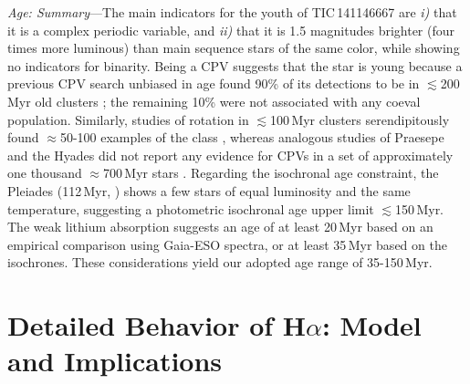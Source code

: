 \documentclass[11pt,twocolumn,tighten,linenumbers]{aastex7}
\begin{document}
{\it Age: Summary}---The main indicators for the youth of
TIC\,141146667 are {\it i)} that it is a complex periodic variable, and
{\it ii)} that it is 1.5 magnitudes brighter (four times more
luminous) than main sequence stars of the same color, while showing no
indicators for binarity.  Being a CPV suggests that the star is young
because a previous CPV search unbiased in age found 90\% of its
detections to be in $\lesssim$200\,Myr old clusters \citep{Bouma2024};
the remaining 10\% were not associated with any coeval population.
Similarly, studies of rotation in $\lesssim$100\,Myr clusters
serendipitously found $\approx$50-100 examples of the class
\citep{Rebull2016,Stauffer2017,Stauffer2018,Rebull2018,Zhan2019,Rebull2020,Stauffer2021,Rebull2022,Popinchalk2023},
whereas analogous studies of Praesepe and the Hyades did not report
any evidence for CPVs in a set of approximately one thousand
$\approx$700\,Myr stars \citep{Rebull2017,Douglas2019,Rampalli2021}.
Regarding the isochronal age constraint, the Pleiades (112\,Myr,
\citealt{Dahm2015}) shows a few stars of equal luminosity and the same
temperature, suggesting a photometric isochronal age upper limit
$\lesssim$150\,Myr.  The weak lithium absorption suggests an age of at
least 20\,Myr based on an empirical comparison using Gaia-ESO spectra,
or at least 35\,Myr based on the \citet{Feiden2016} isochrones.  These
considerations yield our adopted age range of 35-150\,Myr.




\section{Detailed Behavior of H$\alpha$: Model and Implications}
\label{subsec:halpha}
\end{document}
